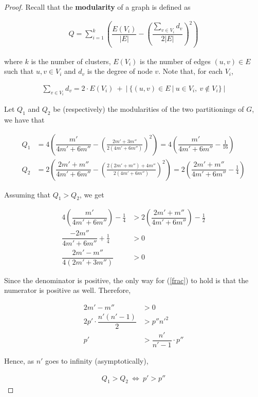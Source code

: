 \begin{proof}
	Recall that the \textbf{modularity}\cite{mod} of a graph is defined as
	
	\begin{align*}
		Q = \sum_{i = 1}^{k} \left( \dfrac{E(V_i)}{|E|} - \left( \dfrac{\sum_{v \in V_i} d_v}{2|E|} \right)^2 \right) 
	\end{align*}
	
	\medskip
	\noindent where $k$ is the number of clusters, $E(V_i)$ is the number of edges $(u,v) \in E$ such that $u,v \in V_i$ and $d_v$ is the degree of node $v$. Note that, for each $V_i$,
	
	\begin{align*}
		\sum_{v \in V_i} d_v = 2 \cdot E(V_i) \ + \ |\ \{(u,v) \in E \ | \ u \in V_i, \ v \notin V_i\}\ |
	\end{align*}
	
	\medskip
	\noindent Let $Q_1$ and $Q_2$ be  (respectively) the modularities of the two partitionings of $G$, we have that
	
	\begin{align*}
		Q_1 &= 4 \left( \dfrac{m'}{4m' + 6m''} - \left( \frac{2m' + 3m''}{2(4m' + 6m'')} \right)^2 \right) = 4 \left( \dfrac{m'}{4m' + 6m''} - \frac{1}{16} \right)\\
		Q_2 &= 2 \left( \dfrac{2m' + m''}{4m' + 6m''} - \left( \frac{2(2m' + m'') + 4m''}{2(4m' + 6m'')} \right)^2 \right) = 2 \left( \dfrac{2m' + m''}{4m' + 6m''} - \frac{1}{4} \right) 
	\end{align*}
	
	\medskip
	\noindent Assuming that $Q_1 > Q_2$, we get
	
	\begin{align}
		4 \left( \dfrac{m'}{4m' + 6m''} \right) - \frac{1}{4} &> 2 \left( \dfrac{2m' + m''}{4m' + 6m''} \right) - \frac{1}{2} \nonumber\\ 
		\dfrac{- 2m''}{4m' + 6m''} + \frac{1}{4} &> 0 \nonumber\\ 
		\dfrac{2m' - m''}{4(2m' + 3m'')} &> 0 \label{frac}
	\end{align}
	
	\medskip
	\noindent Since the denominator is positive, the only way for (\ref{frac}) to hold is that the numerator is positive as well. Therefore,
	
	\begin{align*}
		2m' - m'' &> 0\\
		2p' \cdot \dfrac{n'(n'-1)}{2} &> p''n'^2\\
		p' &> \dfrac{n'}{n'-1} \cdot p''
	\end{align*}
	
	\medskip
	\noindent Hence, as $n'$ goes to infinity (asymptotically),
	
	\begin{align*}
		Q_1 > Q_2 \ \Leftrightarrow \ p' > p''
	\end{align*}
\end{proof}

